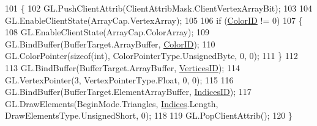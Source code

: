 \begin{DoxyCode}
101         \{
102             GL.PushClientAttrib(ClientAttribMask.ClientVertexArrayBit);
103 
104             GL.EnableClientState(ArrayCap.VertexArray);
105 
106             \textcolor{keywordflow}{if} (\hyperlink{class_tri_devs_1_1_tri_engine_1_1_graphics_1_1_primitive_a0bd74b43131748d2876b7f389858c7cf}{ColorID} != 0)
107             \{
108                 GL.EnableClientState(ArrayCap.ColorArray);
109                 GL.BindBuffer(BufferTarget.ArrayBuffer, \hyperlink{class_tri_devs_1_1_tri_engine_1_1_graphics_1_1_primitive_a0bd74b43131748d2876b7f389858c7cf}{ColorID});
110                 GL.ColorPointer(\textcolor{keyword}{sizeof}(\textcolor{keywordtype}{int}), ColorPointerType.UnsignedByte, 0, 0);
111             \}
112 
113             GL.BindBuffer(BufferTarget.ArrayBuffer, \hyperlink{class_tri_devs_1_1_tri_engine_1_1_graphics_1_1_primitive_ab69b6bf1de5e766b83c4dbc19604cd3e}{VerticesID});
114             GL.VertexPointer(3, VertexPointerType.Float, 0, 0);
115 
116             GL.BindBuffer(BufferTarget.ElementArrayBuffer, \hyperlink{class_tri_devs_1_1_tri_engine_1_1_graphics_1_1_primitive_a2cc647531c7713b290d09b0131c48411}{IndicesID});
117             GL.DrawElements(BeginMode.Triangles, \hyperlink{class_tri_devs_1_1_tri_engine_1_1_graphics_1_1_primitive_a9285dfb37036c35155ba83ade5c310a3}{Indices}.Length, DrawElementsType.UnsignedShort, 0);
118             
119             GL.PopClientAttrib();
120         \}
\end{DoxyCode}


